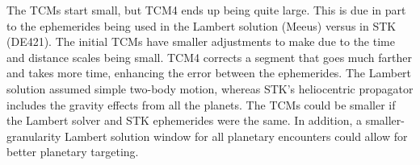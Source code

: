 \documentclass[]{aiaa-tc}%
\begin{document}
The TCMs start small, but TCM4 ends up being quite large. This is due in part to the ephemerides being used in the Lambert solution (Meeus\cite{Meeus}) versus in STK (DE421). The initial TCMs have smaller adjustments to make due to the time and distance scales being small. TCM4 corrects a segment that goes much farther and takes more time, enhancing the error between the ephemerides. The Lambert solution assumed simple two-body motion, whereas STK's heliocentric propagator includes the gravity effects from all the planets. The TCMs could be smaller if the Lambert solver and STK ephemerides were the same. In addition, a smaller-granularity Lambert solution window for all planetary encounters could allow for better planetary targeting.
	
	\vspace{5 mm}
\end{document}
